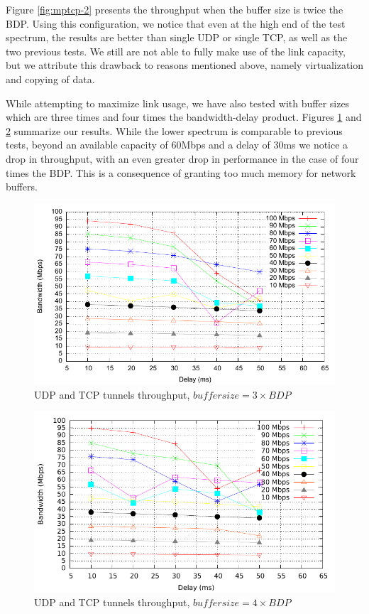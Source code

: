 Figure \ref{fig:mptcp-2} presents the throughput when the buffer size is twice
the BDP. Using this configuration, we notice that even at the high end of the
test spectrum, the results are better than single UDP or single TCP, as well
as the two previous tests. We still are not able to fully make use of the link
capacity, but we attribute this drawback to reasons mentioned above, namely
virtualization and copying of data.

While attempting to maximize link usage, we have also tested with buffer sizes
which are three times and four times the bandwidth-delay product. Figures
\ref{fig:mptcp-3} and \ref{fig:mptcp-4} summarize our results. While the lower
spectrum is comparable to previous tests, beyond an available capacity of 60Mbps
and a delay of 30ms we notice a drop in throughput, with an even greater drop
in performance in the case of four times the BDP. This is a consequence of
granting too much memory for network buffers.

\begin{figure}
  \centering
  \includegraphics[width=\textwidth]{img/test-mptcp-3}
  \caption{UDP and TCP tunnels throughput, $buffer size = 3 \times BDP$}
  \label{fig:mptcp-3}
\end{figure}

\begin{figure}
  \centering
  \includegraphics[width=\textwidth]{img/test-mptcp-4}
  \caption{UDP and TCP tunnels throughput, $buffer size = 4 \times BDP$}
  \label{fig:mptcp-4}
\end{figure}


